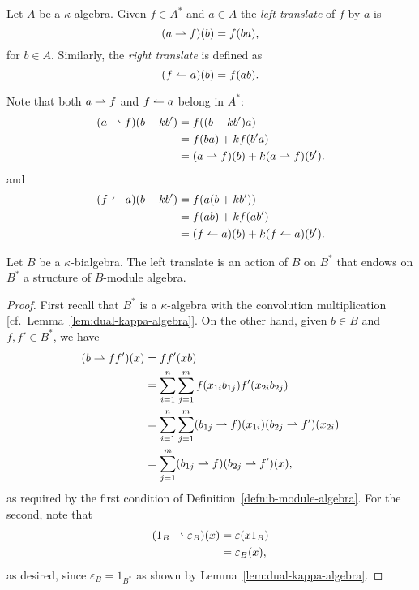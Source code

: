 \begin{defn}
    Let\/ $A$ be a\/ $\kappa$-algebra. Given\/ $f\in A^*$ and $a\in A$ the \textsl{left translate} of $f$ by $a$ is
    $$
        (a\rightharpoonup f)(b) = f(ba),
    $$
    for $b\in A$. Similarly, the \textsl{right translate} is defined as
    $$
        (f\leftharpoonup a)(b) = f(ab).
    $$
\end{defn}

\begin{rem}
    Note that both $a\rightharpoonup f$ and $f\leftharpoonup a$ belong in $A^*$:
    \begin{align*}
        (a\rightharpoonup f)(b+kb') &= f((b+kb')a)\\
            &= f(ba)+kf(b'a)\\
            &= (a\rightharpoonup f)(b) + k(a\rightharpoonup f)(b').
    \end{align*}
    and
    \begin{align*}
        (f\leftharpoonup a)(b+kb') &= f(a(b+kb'))\\
            &= f(ab) + kf(ab')\\
            &= (f\leftharpoonup a)(b) + k(f\leftharpoonup a)(b').
    \end{align*}
\end{rem}

\begin{prop}
    Let $B$ be a $\kappa$-bialgebra. The left translate is an action of $B$ on $B^*$ that endows on $B^*$ a structure of $B$-module algebra.
\end{prop}

\begin{proof}
    First recall that $B^*$ is a $\kappa$-algebra with the convolution multiplication [cf.~Lemma~\ref{lem:dual-kappa-algebra}]. On the other hand, given $b\in B$ and $f,f'\in B^*$, we have
    \begin{align*}
        (b\rightharpoonup ff')(x) &= ff'(xb)\\
            &= \sum_{i=1}^n\sum_{j=1}^mf(x_{1i}b_{1j})f'(x_{2i}b_{2j})\\
            &= \sum_{i=1}^n\sum_{j=1}^m(b_{1j}\rightharpoonup f)(x_{1i})
                (b_{2j}\rightharpoonup f')(x_{2i})\\
            &= \sum_{j=1}^m(b_{1j}\rightharpoonup f)(b_{2j}\rightharpoonup f')(x),
    \end{align*}
    as required by the first condition of Definition~\ref{defn:b-module-algebra}. For the second, note that
    \begin{align*}
        (1_B\rightharpoonup\varepsilon_B)(x) &= \varepsilon(x1_B)\\
            &= \varepsilon_B(x),
    \end{align*}
    as desired, since $\varepsilon_B=1_{B^*}$ as shown by Lemma~\ref{lem:dual-kappa-algebra}.
\end{proof}

